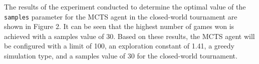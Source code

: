 The results of the experiment conducted to determine the optimal value of the \texttt{samples} parameter for the MCTS agent in the closed-world tournament are shown in Figure 2. It can be seen that the highest number of games won is achieved with a samples value of 30. Based on these results, the MCTS agent will be configured with a limit of 100, an exploration constant of 1.41, a greedy simulation type, and a samples value of 30 for the closed-world tournament.

